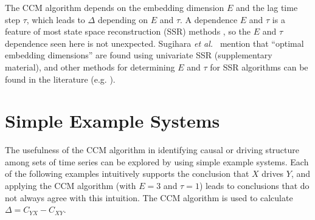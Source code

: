 \documentclass[twocolumn,aps,pre,groupedaddress]{revtex4-1}
\begin{document}
The CCM algorithm depends on the embedding dimension $E$ and the lag time step $\tau$, which leads to $\Delta$ depending on $E$ and $\tau$.  A dependence $E$ and $\tau$ is a feature of most state space reconstruction (SSR) methods \cite{Hong2006,vlachos2009,Small2004}, so the $E$ and $\tau$ dependence seen here is not unexpected.  Sugihara {\em et al.\ } mention that ``optimal embedding dimensions'' are found using univariate SSR \cite{Sugihara2012} (supplementary material), and other methods for determining $E$ and $\tau$ for SSR algorithms can be found in the literature (e.g. \cite{Hong2006,Small2004,Kennel1992}).

\section{Simple Example Systems}
The usefulness of the CCM algorithm in identifying causal or driving structure among sets of time series can be explored by using simple example systems.  Each of the following examples intuitively supports the conclusion that $X$ drives $Y$, and applying the CCM algorithm (with $E=3$ and $\tau=1$) leads to conclusions that do not always agree with this intuition.  The CCM algorithm is used to calculate $\Delta = C_{YX}-C_{XY}$.  
\end{document}
